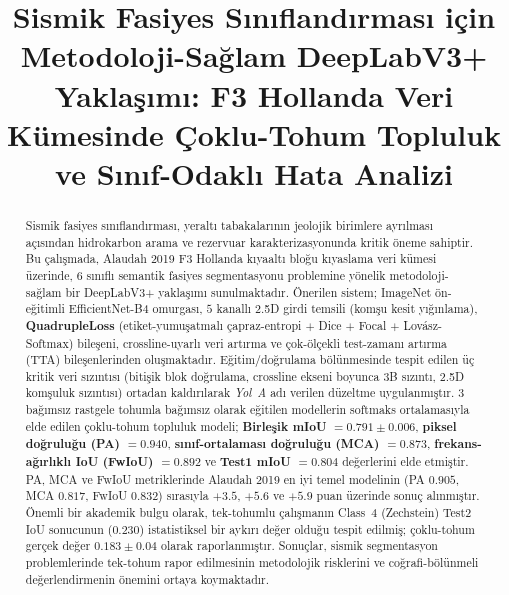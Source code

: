 \documentclass[conference,a4paper,10pt]{IEEEtran}
\begin{document}
\title{Sismik Fasiyes Sınıflandırması için Metodoloji-Sağlam DeepLabV3+ Yaklaşımı: F3 Hollanda Veri Kümesinde Çoklu-Tohum Topluluk ve Sınıf-Odaklı Hata Analizi}

\author{%
}

\maketitle

\begin{abstract}
Sismik fasiyes sınıflandırması, yeraltı tabakalarının jeolojik birimlere ayrılması açısından
hidrokarbon arama ve rezervuar karakterizasyonunda kritik öneme sahiptir. Bu çalışmada,
Alaudah 2019 F3 Hollanda kıyaaltı bloğu kıyaslama veri kümesi üzerinde, 6 sınıflı semantik
fasiyes segmentasyonu problemine yönelik metodoloji-sağlam bir DeepLabV3+ yaklaşımı
sunulmaktadır. Önerilen sistem; ImageNet ön-eğitimli EfficientNet-B4 omurgası,
$5$ kanallı 2.5D girdi temsili (komşu kesit yığınlama), \textbf{QuadrupleLoss}
(etiket-yumuşatmalı çapraz-entropi $+$ Dice $+$ Focal $+$ Lovász-Softmax) bileşeni,
crossline-uyarlı veri artırma ve çok-ölçekli test-zamanı artırma (TTA) bileşenlerinden
oluşmaktadır. Eğitim/doğrulama bölünmesinde tespit edilen üç kritik veri sızıntısı
(bitişik blok doğrulama, crossline ekseni boyunca 3B sızıntı, 2.5D komşuluk sızıntısı)
ortadan kaldırılarak \emph{Yol~A} adı verilen düzeltme uygulanmıştır. 3 bağımsız
rastgele tohumla bağımsız olarak eğitilen modellerin softmaks ortalamasıyla elde edilen
çoklu-tohum topluluk modeli; \textbf{Birleşik mIoU} $\mathbf{= 0.791 \pm 0.006}$,
\textbf{piksel doğruluğu (PA) $\mathbf{= 0.940}$}, \textbf{sınıf-ortalaması doğruluğu
(MCA) $\mathbf{= 0.873}$}, \textbf{frekans-ağırlıklı IoU (FwIoU) $\mathbf{= 0.892}$}
ve \textbf{Test1 mIoU $\mathbf{= 0.804}$} değerlerini elde etmiştir. PA, MCA ve FwIoU
metriklerinde Alaudah 2019 en iyi temel modelinin (PA $0.905$, MCA $0.817$,
FwIoU $0.832$) sırasıyla $+3.5$, $+5.6$ ve $+5.9$ puan üzerinde sonuç alınmıştır. Önemli bir
akademik bulgu olarak, tek-tohumlu çalışmanın Class~4 (Zechstein) Test2 IoU sonucunun
($0.230$) istatistiksel bir aykırı değer olduğu tespit edilmiş; çoklu-tohum gerçek
değer $0.183 \pm 0.04$ olarak raporlanmıştır. Sonuçlar, sismik segmentasyon
problemlerinde tek-tohum rapor edilmesinin metodolojik risklerini ve coğrafi-bölünmeli
değerlendirmenin önemini ortaya koymaktadır.
\end{abstract}
\end{document}
